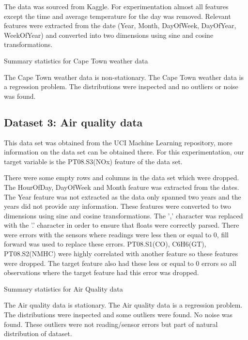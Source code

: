 \documentclass[conference]{IEEEtran}
\begin{document}
The data was sourced from Kaggle. For experimentation almost all features except the time and average temperature for the day was removed. Relevant features were extracted from the date (Year, Month, DayOfWeek, DayOfYear, WeekOfYear) and converted into two dimensions using sine and cosine transformations.

\begin{table}[H]
	\centering
	\small
	\caption{Summary statistics for Cape Town weather data}
	\label{tab:ct}
\end{table}


The Cape Town weather data is non-stationary. The Cape Town weather data is a regression problem. The distributions were inspected and no outliers or noise was found.
 
\subsection{Dataset 3: Air quality data}

This data set was obtained from the UCI Machine Learning repository, more information on the data set can be obtained there. For this experimentation, our target variable is the PT08.S3(NOx) feature of the data set.

There were some empty rows and columns in the data set which were dropped. The HourOfDay, DayOfWeek and Month feature was extracted from the dates. The Year feature was not extracted as the data only spanned two years and the years did not provide any information. These features were converted to two dimensions using sine and cosine transformations. The ',' character was replaced with the '.' character in order to ensure that floats were correctly parsed. There were errors with the sensors where readings were less then or equal to 0, fill forward was used to replace these errors. PT08.S1(CO), C6H6(GT), PT08.S2(NMHC) were highly correlated with another feature so these features were dropped. The target feature also had these less or equal to 0 errors so all observations where the target feature had this error was dropped.

\begin{table}[H]
	\centering
	\caption{Summary statistics for Air Quality data}
	\label{tab:aq-stats}
\end{table}


The Air quality data is stationary. The Air quality data is a regression problem. The distributions were inspected and some outliers were found. No noise was found. These outliers were not reading/sensor errors but part of natural distribution of dataset.
\end{document}
